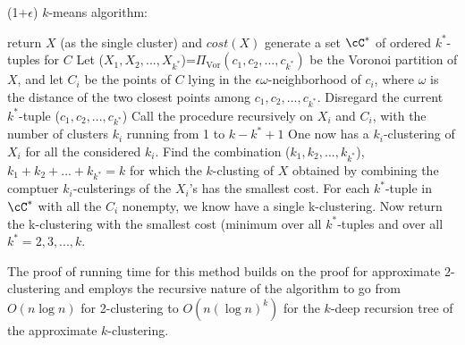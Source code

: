 \begin{algorithm}[H]
  \caption{(1+$\epsilon$) $k$-means algorithm:}
\begin{algorithmic} 
  \STATE return $X$ (as the single cluster) and $cost(X)$
\ENDIF
{}
  \STATE generate a set $\cC^*$ of ordered $k^*$-tuples for $C$
    \STATE Let ($X_1,X_2,...,X_{k^*}$)=$\Pi_{\text{Vor}}(c_1,c_2,...,c_{k^*})$ be
    the Voronoi partition of $X$, and let $C_i$ be the points of $C$ lying in the
    $\epsilon \omega$-neighborhood of $c_i$, where $\omega$ is the distance of
    the two closest points among $c_1,c_2,...,c_{k^*}$.
      \STATE Disregard the current $k^*$-tuple
      ($c_1,c_2,...,c_{k^*}$)
    \ELSE
        \STATE Call the procedure recursively on $X_i$ and $C_i$, with
        the number of clusters $k_i$ running from 1 to $k-k^*+1$
      \ENDFOR
      \STATE One now has a $k_i$-clustering of $X_i$ for all the
      considered $k_i$.
      \STATE Find the combination
      ($k_1,k_2,...,k_{k^*}$),$k_1+k_2+...+k_{k^*}=k$ for which the
      $k$-clusting of $X$ obtained by combining the comptuer
      $k_i$-culsterings of the $X_i$'s has the smallest cost.
    \ENDIF
  \ENDFOR
\ENDFOR
\STATE For each $k^*$-tuple in $\cC^*$ with all the $C_i$ nonempty,
we know have a single k-clustering. Now return the k-clustering with
the smallest cost (minimum over all $k^*$-tuples and over all $k^*=2,3,...,k$.
\end{algorithmic}
\end{algorithm}

\begin{remark}
The proof of running time for this method builds on the proof for approximate $2$-clustering and employs the recursive nature of the algorithm to go from $O(n \log n)$ for 2-clustering to $O(n (\log n)^k)$ for the $k$-deep recursion tree of the approximate $k$-clustering.
\end{remark}


